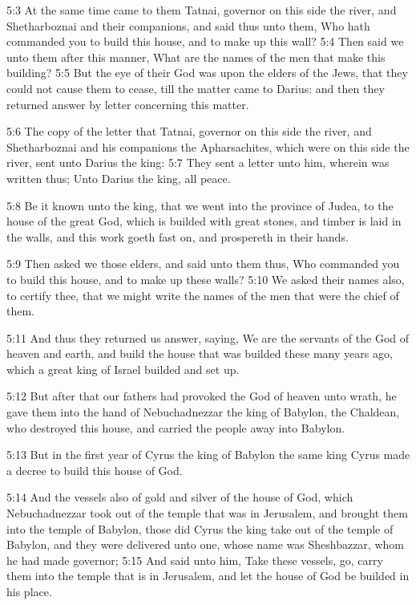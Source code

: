 5:3 At the same time came to them Tatnai, governor on this side the river, and Shetharboznai and their companions, and said thus unto them, Who hath commanded you to build this house, and to make up this wall?  5:4 Then said we unto them after this manner, What are the names of the men that make this building?  5:5 But the eye of their God was upon the elders of the Jews, that they could not cause them to cease, till the matter came to Darius: and then they returned answer by letter concerning this matter.

5:6 The copy of the letter that Tatnai, governor on this side the river, and Shetharboznai and his companions the Apharsachites, which were on this side the river, sent unto Darius the king: 5:7 They sent a letter unto him, wherein was written thus; Unto Darius the king, all peace.

5:8 Be it known unto the king, that we went into the province of Judea, to the house of the great God, which is builded with great stones, and timber is laid in the walls, and this work goeth fast on, and prospereth in their hands.

5:9 Then asked we those elders, and said unto them thus, Who commanded you to build this house, and to make up these walls?  5:10 We asked their names also, to certify thee, that we might write the names of the men that were the chief of them.

5:11 And thus they returned us answer, saying, We are the servants of the God of heaven and earth, and build the house that was builded these many years ago, which a great king of Israel builded and set up.

5:12 But after that our fathers had provoked the God of heaven unto wrath, he gave them into the hand of Nebuchadnezzar the king of Babylon, the Chaldean, who destroyed this house, and carried the people away into Babylon.

5:13 But in the first year of Cyrus the king of Babylon the same king Cyrus made a decree to build this house of God.

5:14 And the vessels also of gold and silver of the house of God, which Nebuchadnezzar took out of the temple that was in Jerusalem, and brought them into the temple of Babylon, those did Cyrus the king take out of the temple of Babylon, and they were delivered unto one, whose name was Sheshbazzar, whom he had made governor; 5:15 And said unto him, Take these vessels, go, carry them into the temple that is in Jerusalem, and let the house of God be builded in his place.

